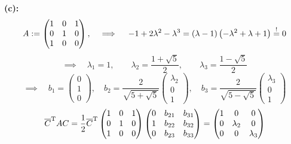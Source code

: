 		\textbf{(c):}
		\[
			A :=
			\begin{pmatrix}
				1 & 0 & 1 \\
				0 & 1 & 0 \\
				1 & 0 & 0
			\end{pmatrix}
			,\quad \implies \quad -1 + 2\lambda^2-\lambda^3=(\lambda - 1)\left( -\lambda^2+\lambda+1 \right) \stackrel{!}{=}0
		\]
		\[ \implies \quad \lambda_1=1,\qquad \lambda_2=\frac{1+\sqrt{5}}{2},\qquad \lambda_3 = \frac{1-\sqrt{5}}{2} \]
		\[
			\implies \quad
			b_1 =
			\begin{pmatrix}
				0 \\ 1 \\ 0
			\end{pmatrix}
			,\quad
			b_2 = \frac{2}{\sqrt{5+\sqrt{5}}}
			\begin{pmatrix}
				\lambda_2 \\ 0 \\ 1
			\end{pmatrix}
			,\quad
			b_3 = \frac{2}{\sqrt{5-\sqrt{5}}}
			\begin{pmatrix}
				\lambda_3 \\ 0 \\ 1
			\end{pmatrix}
		\]
		\[
			{\overline{C}}^{\mathrm{T}}AC = \frac{1}{2}
			{\overline{C}}^{\mathrm{T}}
			\begin{pmatrix}
				1 & 0 & 1 \\
				0 & 1 & 0 \\
				1 & 0 & 0
			\end{pmatrix}
			\begin{pmatrix}
				0 & b_{21} & b_{31} \\
				1 & b_{22} & b_{32} \\
				0 & b_{23} & b_{33}
			\end{pmatrix}
			=
			\begin{pmatrix}
				1 & 0 & 0 \\
				0 & \lambda_2 & 0 \\
				0 & 0 & \lambda_3 
			\end{pmatrix}
		\]


